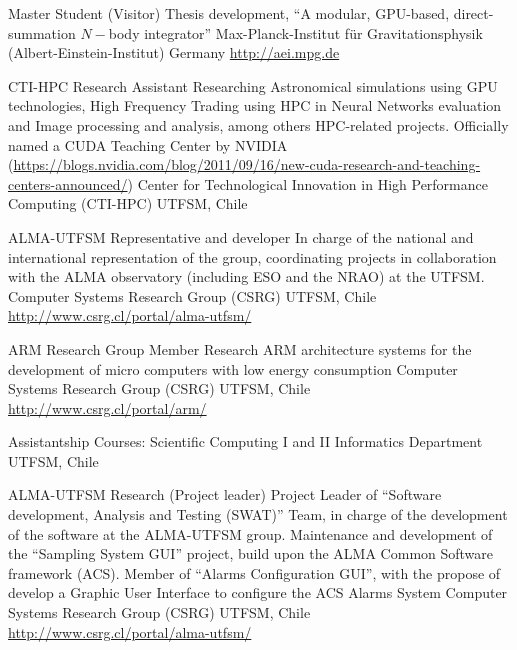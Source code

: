 \documentclass[12pt,a4paper]{moderncv}
\newcommand{\gray}{\textcolor{gray}}
\newcommand{\myurl}[1]{\gray{\url{#1}}}
\newcommand{\aei}{Max-Planck-Institut für Gravitationsphysik (Albert-Einstein-Institut)}
\begin{document}
        {Master Student (Visitor)}
        {Thesis development, %
        ``A modular, GPU-based, direct-summation $N-$body integrator'' }
        {\aei}
        {Germany}
        {\myurl{http://aei.mpg.de}}

        {CTI-HPC Research Assistant}
        {Researching %
         Astronomical simulations using GPU technologies, %
         High Frequency Trading using HPC in Neural Networks evaluation %
         and Image processing and analysis, among others HPC-related projects.
         Officially named a CUDA Teaching Center by NVIDIA
         (\myurl{https://blogs.nvidia.com/blog/2011/09/16/new-cuda-research-and-teaching-centers-announced/})
         }
        {Center for Technological Innovation in High Performance Computing (CTI-HPC)}
        {UTFSM, Chile}
        {}

        {ALMA-UTFSM Representative and developer}
        {In charge of the national and international representation of the group,
         coordinating projects in collaboration with the ALMA observatory
         (including ESO and the NRAO) at the UTFSM.}
        {Computer Systems Research Group (CSRG)}
        {UTFSM, Chile}
        {\myurl{http://www.csrg.cl/portal/alma-utfsm/}}

        {ARM Research Group Member}
        {Research ARM architecture systems for the development of micro computers
         with low energy consumption}
        {Computer Systems Research Group (CSRG)}
        {UTFSM, Chile}
        {\myurl{http://www.csrg.cl/portal/arm/}}

        {Assistantship}
        {Courses: Scientific Computing I and II}
        {Informatics Department}
        {UTFSM, Chile}
        {}

        {ALMA-UTFSM Research (Project leader)}
        {Project Leader of ``Software development, Analysis and Testing (SWAT)''
         Team, in charge of the development of the software at the ALMA-UTFSM group.
         Maintenance and development of the ``Sampling System GUI'' project,
         build upon the ALMA Common Software framework (ACS).
         Member of ``Alarms Configuration GUI'', with the propose of develop a
         Graphic User Interface to configure the ACS Alarms System}
        {Computer Systems Research Group (CSRG)}
        {UTFSM, Chile}
        {\myurl{http://www.csrg.cl/portal/alma-utfsm/}}
\end{document}
